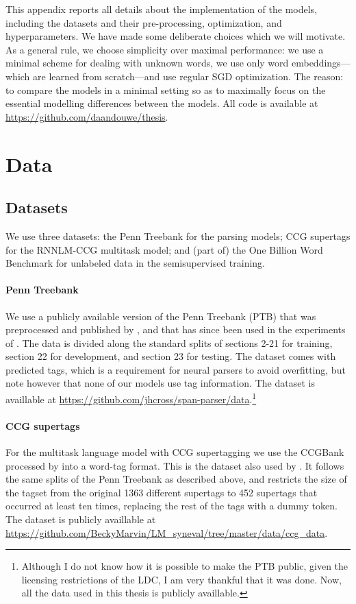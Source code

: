 This appendix reports all details about the implementation of the models, including the datasets and their pre-processing, optimization, and hyperparameters. We have made some deliberate choices which we will motivate. As a general rule, we choose simplicity over maximal performance: we use a minimal scheme for dealing with unknown words, we use only word embeddings---which are learned from scratch---and use regular SGD optimization. The reason: to compare the models in a minimal setting so as to maximally focus on the essential modelling differences between the models. All code is available at \url{https://github.com/daandouwe/thesis}.

\section{Data}

  \subsection{Datasets}
    We use three datasets: the Penn Treebank for the parsing models; CCG supertags for the RNNLM-CCG multitask model; and (part of) the One Billion Word Benchmark for unlabeled data in the semisupervised training.

    \paragraph{Penn Treebank}
    We use a publicly available version of the Penn Treebank (PTB) that was preprocessed and published by \citet{cross2016span}, and that has since been used in the experiments of \citet{stern2017minimal,kitaev2018attentive}. The data is divided along the standard splits of sections 2-21 for training, section 22 for development, and section 23 for testing. The dataset comes with predicted tags, which is a requirement for neural parsers to avoid overfitting, but note however that none of our models use tag information. The dataset is availlable at \url{https://github.com/jhcross/span-parser/data}.\footnote{Although I do not know how it is possible to make the PTB public, given the licensing restrictions of the LDC, I am very thankful that it was done. Now, all the data used in this thesis is publicly availlable.}

    \paragraph{CCG supertags}
    For the multitask language model with CCG supertagging we use the CCGBank \citep{hockenmaier2007ccgbank} processed by \citet{enguehard2017multitask} into a word-tag format. This is the dataset also used by \citet{linzen2018targeted}. It follows the same splits of the Penn Treebank as described above, and restricts the size of the tagset from the original 1363 different supertags to 452 supertags that occurred at least ten times, replacing the rest of the tags with a dummy token. The dataset is publicly availlable at \url{https://github.com/BeckyMarvin/LM_syneval/tree/master/data/ccg_data}.

